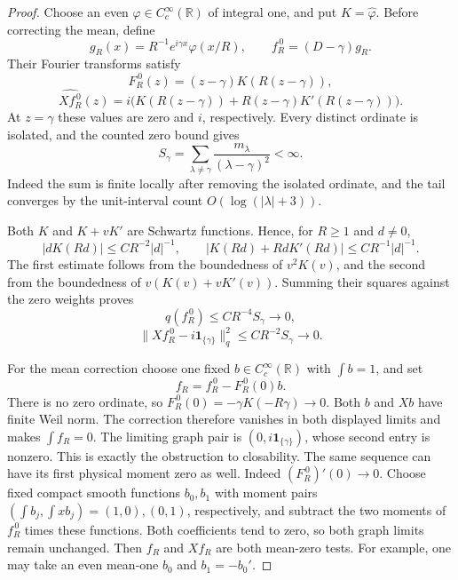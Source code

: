 \begin{proof}
Choose an even \(\varphi\in C_c^\infty(\mathbb R)\) of integral
one, and put \(K=\widehat\varphi\). Before correcting the mean,
define
\[
 g_R(x)=R^{-1}e^{i\gamma x}\varphi(x/R),\qquad
 f_R^{\,0}=(D-\gamma)g_R.
\]
Their Fourier transforms satisfy
\[
 F_R^{\,0}(z)=(z-\gamma)K(R(z-\gamma)),
\]
\[
 \widehat{Xf_R^{\,0}}(z)
 =i\bigl(K(R(z-\gamma))
        +R(z-\gamma)K'(R(z-\gamma))\bigr).
\]
At \(z=\gamma\) these values are zero and \(i\), respectively.
Every distinct ordinate is isolated, and the counted zero bound gives
\[
 S_\gamma=\sum_{\lambda\ne\gamma}
             \frac{m_\lambda}{(\lambda-\gamma)^2}<\infty.
\]
Indeed the sum is finite locally after removing the isolated
ordinate, and the tail converges by the unit-interval count
\(O(\log(|\lambda|+3))\).

Both \(K\) and \(K+vK'\) are Schwartz functions. Hence, for
\(R\ge1\) and \(d\ne0\),
\[
 |dK(Rd)|\le C R^{-2}|d|^{-1},
 \qquad
 |K(Rd)+RdK'(Rd)|\le C R^{-1}|d|^{-1}.
\]
The first estimate follows from the boundedness of \(v^2K(v)\),
and the second from the boundedness of \(v(K(v)+vK'(v))\).
Summing their squares against the zero weights proves
\[
 q(f_R^{\,0})\le C R^{-4}S_\gamma\longrightarrow0,
\]
\[
 \|Xf_R^{\,0}-i\mathbf1_{\{\gamma\}}\|_q^2
 \le C R^{-2}S_\gamma\longrightarrow0.
\]

For the mean correction choose one fixed
\(b\in C_c^\infty(\mathbb R)\) with \(\int b=1\), and set
\[
 f_R=f_R^{\,0}-F_R^{\,0}(0)b.
\]
There is no zero ordinate, so
\(F_R^{\,0}(0)=-\gamma K(-R\gamma)\to0\).
Both \(b\) and \(Xb\) have finite Weil norm. The correction
therefore vanishes in both displayed limits and makes
\(\int f_R=0\). The limiting graph pair is
\((0,i\mathbf1_{\{\gamma\}})\), whose second entry is nonzero.
This is exactly the obstruction to closability.
The same sequence can have its first physical moment zero as well.
Indeed \((F_R^{\,0})'(0)\to0\). Choose fixed compact smooth
functions \(b_0,b_1\) with moment pairs
\((\int b_j,\int xb_j)=(1,0),(0,1)\), respectively, and subtract
the two moments of \(f_R^{\,0}\) times these functions. Both
coefficients tend to zero, so both graph limits remain unchanged.
Then \(f_R\) and \(Xf_R\) are both mean-zero tests. For example,
one may take an even mean-one \(b_0\) and \(b_1=-b_0'\).
\end{proof}

